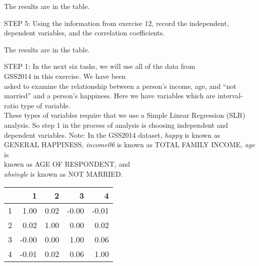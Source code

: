 \documentclass[11pt]{book}\usepackage[]{graphicx}\usepackage[]{color}
\begin{document}
\begin{exercises}
\begin{exercise}

    \end{exercise}
    \begin{solution}    %

      The results are in the table.

    \end{solution}

  \begin{exercise} %

    STEP 5:  Using the information from exercise 12,  record the independent, dependent  variables, and the correlation coefficients.

    \vspace{5mm}

    \end{exercise}
    \begin{solution}    %

  The results are in the table.

    \end{solution}

  \begin{exercise} %

    STEP 1:  In the next six tasks, we will use all of the data from \\ GSS2014 in this exercise.  We have been \\ asked to examine the relationship between a person's income, age, and ``not married'' and a person's happiness.  Here we have variables which are  interval-ratio type of variable.  \\ These types of variables require that we use a Simple Linear Regression (SLR) analysis.  So step 1 in the process of analysis is choosing independent and dependent variables.  Note: In the GSS2014 dataset, {\textit{happy}} is known as GENERAL HAPPINESS, {\textit{income06}} is known as TOTAL FAMILY INCOME, {\textit{age}} is \\ known as AGE OF RESPONDENT, and \\ {\textit{absingle}} is known as NOT MARRIED.

{\small{
\begin{table}[ht]
\centering
\begin{tabular}{rrrrr}
  \hline
 & 1 & 2 & 3 & 4 \\ 
  \hline
1 & 1.00 & 0.02 & -0.00 & -0.01 \\ 
  2 & 0.02 & 1.00 & 0.00 & 0.02 \\ 
  3 & -0.00 & 0.00 & 1.00 & 0.06 \\ 
  4 & -0.01 & 0.02 & 0.06 & 1.00 \\ 
   \hline
\end{tabular}
\end{table}

}}
\end{exercise}
\end{exercises}
\end{document}
